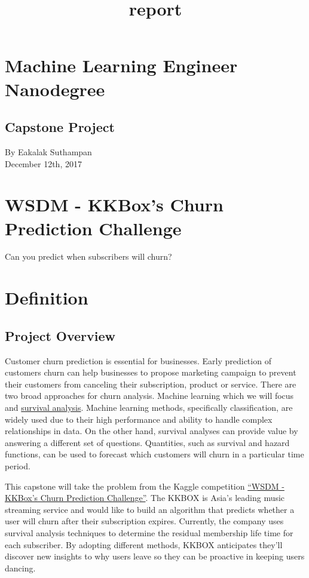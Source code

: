 \documentclass[11pt]{article}
\title{report}
\begin{document}
    
    

    
    

    
    \section{Machine Learning Engineer
Nanodegree}\label{machine-learning-engineer-nanodegree}

\subsection{Capstone Project}\label{capstone-project}

By Eakalak Suthampan\\December 12th, 2017

\section{WSDM - KKBox's Churn Prediction
Challenge}\label{wsdm---kkboxs-churn-prediction-challenge}

Can you predict when subscribers will churn?

\section{Definition}\label{definition}

\subsection{Project Overview}\label{project-overview}

Customer churn prediction is essential for businesses. Early prediction
of customers churn can help businesses to propose marketing campaign to
prevent their customers from canceling their subscription, product or
service. There are two broad approaches for churn analysis. Machine
learning which we will focus and
\href{https://en.wikipedia.org/wiki/Survival_analysis}{survival
analysis}. Machine learning methods, specifically classification, are
widely used due to their high performance and ability to handle complex
relationships in data. On the other hand, survival analyses can provide
value by answering a different set of questions. Quantities, such as
survival and hazard functions, can be used to forecast which customers
will churn in a particular time period.

This capstone will take the problem from the Kaggle competition
\href{https://www.kaggle.com/c/kkbox-churn-prediction-challenge}{``WSDM
- KKBox's Churn Prediction Challenge''}. The KKBOX is Asia's leading
music streaming service and would like to build an algorithm that
predicts whether a user will churn after their subscription expires.
Currently, the company uses survival analysis techniques to determine
the residual membership life time for each subscriber. By adopting
different methods, KKBOX anticipates they'll discover new insights to
why users leave so they can be proactive in keeping users dancing.
\end{document}
